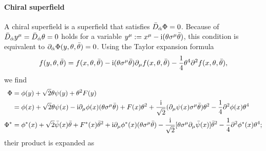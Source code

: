 \documentclass[CheatSheet]{subfiles}
\begin{document}
\paragraph{Chiral superfield} A chiral superfield is a superfield that satisfies $\bar D_{\dot\alpha} \Phi = 0$.
Because of $\bar D_{\dot\alpha} y^\mu=\bar D_{\dot\alpha} \theta=0$ holds for a variable $y^\mu := x^\mu - \mathrm{i}(\theta\sigma^{\mu}\bar\theta)$, this condition is equivalent to $\partial_{\dot\alpha} \Phi(y,\theta,\bar\theta)=0$.
Using the Taylor expansion formula
\begin{equation}
f(y,\theta,\bar\theta)=f(x,\theta,\bar\theta)-\mathrm{i} (\theta \sigma^{\mu}\bar\theta) \partial_{\mu}f(x,\theta,\bar\theta)-\frac{1}{4} \theta^4 \partial^2f(x,\theta,\bar\theta),
\end{equation}
we find
\begin{align}
 \Phi
 &= \phi(y) + \sqrt{2} \theta \psi(y) + \theta^2 F(y)\\
 &= \phi(x)+\sqrt{2} \theta \psi(x)-\mathrm{i} \partial_{\mu}\phi(x) (\theta \sigma^{\mu}\bar\theta)+F(x) \theta^2+\frac{\mathrm{i}}{\sqrt{2}} (\partial_{\mu}\psi(x)\sigma^{\mu}\bar\theta) \theta^2-\frac{1}{4} \partial^2\phi(x) \theta^4
\\
 \Phi^*
 &= \phi^*(x)+\sqrt{2} \bar{\psi}(x)\bar\theta+F^*(x) \bar\theta^2+\mathrm{i} \partial_{\mu}\phi^*(x) (\theta \sigma^{\mu}\bar\theta)-\frac{\mathrm{i}}{\sqrt{2}}[\theta \sigma^{\mu}\partial_{\mu}\bar{\psi}(x)] \bar\theta^2-\frac{1}{4} \partial^2\phi^*(x) \theta^4;
\end{align}
their product is expanded as
\end{document}
